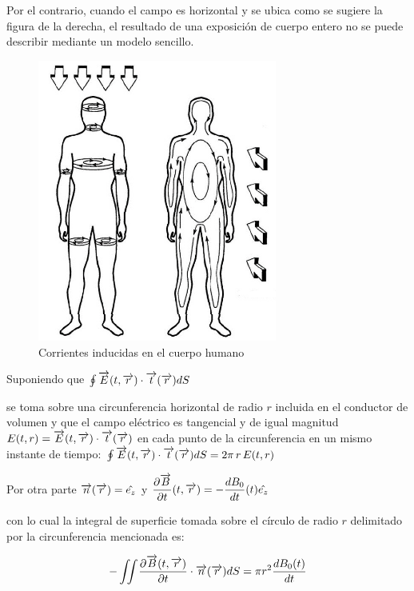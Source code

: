 Por el contrario, cuando el campo es horizontal y se ubica como se sugiere la figura de la derecha, el resultado de una exposición de cuerpo entero no se puede describir mediante un modelo sencillo.

\begin{figure}[H]
    \centering
    \includegraphics[width=0.7\textwidth]{./Figures/fig611}
	\caption{Corrientes inducidas en el cuerpo humano}
	\label{fig:611}
\end{figure}

Suponiendo que $\oint \overrightarrow{E}(t,\overrightarrow{r})\cdot\overrightarrow{t}(\overrightarrow{r})dS$ 

\begin{sloppypar}
se toma sobre una circunferencia horizontal de radio $r$ incluida en el conductor de volumen y que el campo eléctrico es tangencial y de igual magnitud ${E(t, r)=\overrightarrow{E}(t, \overrightarrow{r})\cdot \overrightarrow{t}(\overrightarrow{r})}$ en cada punto de la circunferencia en un mismo instante de tiempo: ${\oint \overrightarrow{E}(t,\overrightarrow{r})\cdot\overrightarrow{t}(\overrightarrow{r}) dS = 2\pi \,r \, E(t,r)}$ 

\end{sloppypar}

Por otra parte $\overrightarrow{n}(\overrightarrow{r})=\hat{e_{z}}$ y $\dfrac{\partial \overrightarrow{B}}{\partial t}(t, \overrightarrow{r})=-\dfrac{dB_{0}}{dt}(t)\hat{e_{z}}$ 

con lo cual la integral de superficie tomada sobre el círculo de radio $r$ delimitado por la circunferencia mencionada es:

\begin{equation}
	-\iint \dfrac{\partial \overrightarrow{B}(t,\overrightarrow{r})}{\partial t}\cdot \overrightarrow{n}(\overrightarrow{r}) dS = \pi r^{2}\dfrac{dB_{0}(t)}{dt}
\end{equation}

